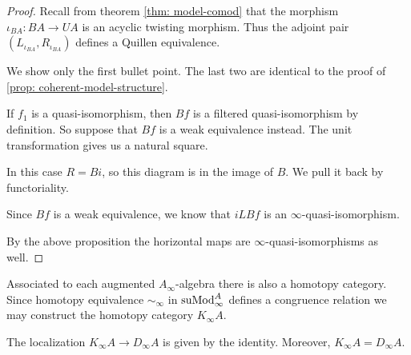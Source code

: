 \documentclass[../thesis.tex]{subfiles}
\begin{document}
            \begin{proof}
                Recall from theorem \ref{thm: model-comod} that the morphism $\iota_{BA} : BA \to UA$ is an acyclic twisting morphism. Thus the adjoint pair $(L_{\iota_{BA}}, R_{\iota_{BA}})$ defines a Quillen equivalence.

                We show only the first bullet point. The last two are identical to the proof of \ref{prop: coherent-model-structure}.

                If $f_1$ is a quasi-isomorphism, then $Bf$ is a filtered quasi-isomorphism by definition. So suppose that $Bf$ is a weak equivalence instead. The unit transformation gives us a natural square.

                \begin{center}
                \end{center}

                In this case $R = Bi$, so this diagram is in the image of $B$. We pull it back by functoriality.

                \begin{center}
                \end{center}

                Since $Bf$ is a weak equivalence, we know that $iLBf$ is an $\infty$-quasi-isomorphism.

                By the above proposition the horizontal maps are $\infty$-quasi-isomorphisms as well.
            \end{proof}

            Associated to each augmented $A_\infty$-algebra there is also a homotopy category. Since homotopy equivalence $\sim_\infty$ in $\tt{suMod}_\infty^A$ defines a congruence relation we may construct the homotopy category $K_\infty A$.

            \begin{corollary}
                The localization $K_\infty A \to D_\infty A$ is given by the identity. Moreover, $K_\infty A = D_\infty A$.
            \end{corollary}
\end{document}
